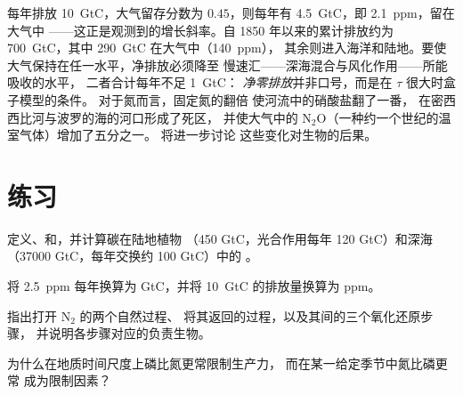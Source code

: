 \begin{example}[数字说明了什么]\label{ex:b2:biogeochemical-cycles:numbers}
每年排放 \qty{10}{GtC}，大气留存分数为
$0.45$，则每年有 \qty{4.5}{GtC}，即 \qty{2.1}{ppm}，留在大气中
——这正是观测到的增长斜率。自 1850 年以来的累计排放约为
\qty{700}{GtC}，其中 \qty{290}{GtC} 在大气中（140~ppm），
其余则进入海洋和陆地。要使大气保持在任一水平，净排放必须降至
慢速汇——深海混合与风化作用——所能吸收的水平，
二者合计每年不足 \qty{1}{GtC}：
\emph{净零排放}并非口号，而是在 $\tau$ 很大时盒子模型的条件。
对于氮而言，固定氮的翻倍
使河流中的硝酸盐翻了一番，
在密西西比河与波罗的海的河口形成了死区，
并使大气中的 $\mathrm{N_2O}$（一种约一个世纪的温室气体）增加了五分之一。
将进一步讨论
这些变化对生物的后果。
\end{example}

\section{练习}

\begin{exercise}[$\star$]\label{exo:b2:biogeochemical-cycles:1}
定义、和，并计算碳在陆地植物
（450 GtC，光合作用每年 120 GtC）和深海
（\num{37000} GtC，每年交换约 100 GtC）中的
。
\end{exercise}

\begin{exercise}[$\star$]\label{exo:b2:biogeochemical-cycles:2}
将 \qty{2.5}{ppm} 每年换算为 GtC，并将
\qty{10}{GtC} 的排放量换算为 ppm。
\end{exercise}

\begin{exercise}[$\star$]\label{exo:b2:biogeochemical-cycles:3}
指出打开 $\mathrm{N_2}$ 的两个自然过程、
将其返回的过程，以及其间的三个氧化还原步骤，
并说明各步骤对应的负责生物。
\end{exercise}

\begin{exercise}[$\star$]\label{exo:b2:biogeochemical-cycles:4}
为什么在地质时间尺度上磷比氮更常限制生产力，
而在某一给定季节中氮比磷更常
成为限制因素？
\end{exercise}

